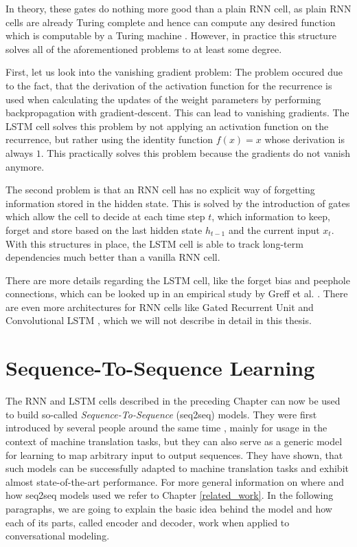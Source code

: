 In theory, these gates do nothing more good than a plain RNN cell, as plain RNN cells are already Turing complete and hence can compute any desired function which is computable by a Turing machine \cite{Siegelmann:1995}. However, in practice this structure solves all of the aforementioned problems to at least some degree.

First, let us look into the vanishing gradient problem: The problem occured due to the fact, that the derivation of the activation function for the recurrence is used when calculating the updates of the weight parameters by performing backpropagation with gradient-descent. This can lead to vanishing gradients. The LSTM cell solves this problem by not applying an activation function on the recurrence, but rather using the identity function $f(x) = x$ whose derivation is always $1$. This practically solves this problem because the gradients do not vanish anymore.

The second problem is that an RNN cell has no explicit way of forgetting information stored in the hidden state. This is solved by the introduction of gates which allow the cell to decide at each time step $t$, which information to keep, forget and store based on the last hidden state $h_{t-1}$ and the current input $x_t$. With this structures in place, the LSTM cell is able to track long-term dependencies much better than a vanilla RNN cell.

There are more details regarding the LSTM cell, like the forget bias and peephole connections, which can be looked up in an empirical study by Greff et al. \cite{Greff:2016}. There are even more architectures for RNN cells like Gated Recurrent Unit \cite{Chung:2014} and Convolutional LSTM \cite{Xingjian:2015}, which we will not describe in detail in this thesis.

\section{Sequence-To-Sequence Learning}
\label{fundamentals:seq2seq}
The RNN and LSTM cells described in the preceding Chapter can now be used to build so-called \emph{Sequence-To-Sequence} (seq2seq) models. They were first introduced by several people around the same time \cite{Sutskever:2014}\cite{Kalchbrenner:2013}\cite{Cho:2014}, mainly for usage in the context of machine translation tasks, but they can also serve as a generic model for learning to map arbitrary input to output sequences. They have shown, that such models can be successfully adapted to machine translation tasks and exhibit almost state-of-the-art performance. For more general information on where and how seq2seq models used we refer to Chapter \ref{related_work}. In the following paragraphs, we are going to explain the basic idea behind the model and how each of its parts, called encoder and decoder, work when applied to conversational modeling.

